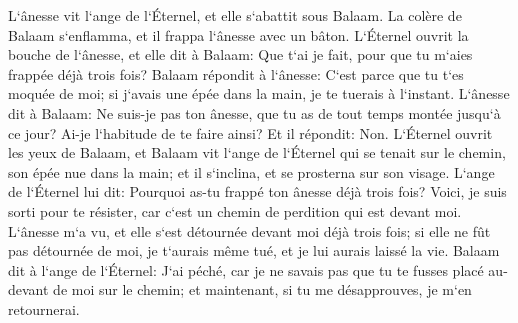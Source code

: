 \verse L`ânesse vit l`ange de l`Éternel, et elle s`abattit sous Balaam. La colère de Balaam s`enflamma, et il frappa l`ânesse avec un bâton. 
\verse L`Éternel ouvrit la bouche de l`ânesse, et elle dit à Balaam: Que t`ai je fait, pour que tu m`aies frappée déjà trois fois? 
\verse Balaam répondit à l`ânesse: C`est parce que tu t`es moquée de moi; si j`avais une épée dans la main, je te tuerais à l`instant. 
\verse L`ânesse dit à Balaam: Ne suis-je pas ton ânesse, que tu as de tout temps montée jusqu`à ce jour? Ai-je l`habitude de te faire ainsi? Et il répondit: Non. 
\verse L`Éternel ouvrit les yeux de Balaam, et Balaam vit l`ange de l`Éternel qui se tenait sur le chemin, son épée nue dans la main; et il s`inclina, et se prosterna sur son visage. 
\verse L`ange de l`Éternel lui dit: Pourquoi as-tu frappé ton ânesse déjà trois fois? Voici, je suis sorti pour te résister, car c`est un chemin de perdition qui est devant moi. 
\verse L`ânesse m`a vu, et elle s`est détournée devant moi déjà trois fois; si elle ne fût pas détournée de moi, je t`aurais même tué, et je lui aurais laissé la vie. 
\verse Balaam dit à l`ange de l`Éternel: J`ai péché, car je ne savais pas que tu te fusses placé au-devant de moi sur le chemin; et maintenant, si tu me désapprouves, je m`en retournerai. 
